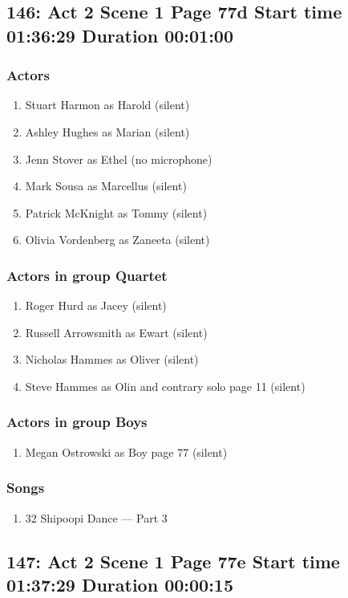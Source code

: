 \subsection{146: Act 2 Scene 1 Page 77d Start time 01:36:29 Duration 00:01:00}

\subsubsection{Actors}
\begin{enumerate}
\item Stuart Harmon as Harold (silent)
\item Ashley Hughes as Marian (silent)
\item Jenn Stover as Ethel (no microphone)
\item Mark Sousa as Marcellus (silent)
\item Patrick McKnight as Tommy (silent)
\item Olivia Vordenberg as Zaneeta (silent)
\end{enumerate}
\subsubsection{Actors in group Quartet}
\begin{enumerate}
\item Roger Hurd as Jacey (silent)
\item Russell Arrowsmith as Ewart (silent)
\item Nicholas Hammes as Oliver (silent)
\item Steve Hammes as Olin and contrary solo page 11 (silent)
\end{enumerate}
\subsubsection{Actors in group Boys}
\begin{enumerate}
\item Megan Ostrowski as Boy page 77 (silent)
\end{enumerate}

\subsubsection{Songs}
\begin{enumerate}
\item 32 Shipoopi Dance --- Part 3
\end{enumerate}
\subsection{147: Act 2 Scene 1 Page 77e Start time 01:37:29 Duration 00:00:15}

